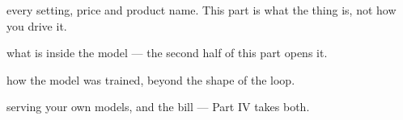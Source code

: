 \documentclass[10pt, twoside, openany]{book}
\begin{document}


\frontmatter
{}


\tableofcontents
\toplevelchapters

\partlevels                 %

\mainmatter


  {every setting, price and product name. This part is what the thing is,
   not how you drive it.}

  {what is inside the model --- the second half of this part opens it.}






% 

  {how the model was trained, beyond the shape of the loop.}
% 
% 
% 
% 
% 
% 
% 
% 
% 
% 

  {serving your own models, and the bill --- Part IV takes both.}
% 
% 
% 
% 
% 
% 
% 
% 
% 
% 
% 
% 
% 
% 
% 
% 
% 
% 
% 
% 
% 
% 
\end{document}
